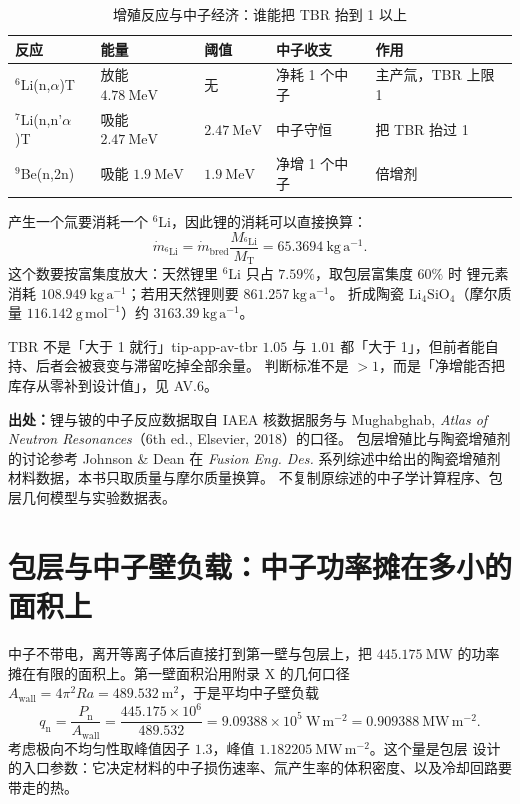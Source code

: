 \begin{table}[htbp]
\centering
\small
\caption{增殖反应与中子经济：谁能把 TBR 抬到 1 以上}
\label{tab:app-av-breeding}
\begin{tabular}{p{3.9cm}p{2.2cm}p{2.0cm}p{3.2cm}p{3.4cm}}
\hline
反应 & 能量 & 阈值 & 中子收支 & 作用 \\
\hline
$^{6}$Li(n,$\alpha$)T & 放能 $4.78\ \mathrm{MeV}$ & 无 & 净耗 1 个中子 & 主产氚，TBR 上限 1 \\
$^{7}$Li(n,n'$\alpha$)T & 吸能 $2.47\ \mathrm{MeV}$ & $2.47\ \mathrm{MeV}$ & 中子守恒 & 把 TBR 抬过 1 \\
$^{9}$Be(n,2n) & 吸能 $1.9\ \mathrm{MeV}$ & $1.9\ \mathrm{MeV}$ & 净增 1 个中子 & 倍增剂 \\
\hline
\end{tabular}
\end{table}

产生一个氚要消耗一个 $^{6}$Li，因此锂的消耗可以直接换算：
\begin{equation}
\dot m_{{}^{6}\mathrm{Li}}=\dot m_\mathrm{bred}\frac{M_{{}^{6}\mathrm{Li}}}{M_\mathrm{T}}
=65.3694\ \mathrm{kg\,a^{-1}}.
\label{eq:app-av-limass}
\end{equation}
这个数要按富集度放大：天然锂里 $^{6}$Li 只占 $7.59\%$，取包层富集度 $60\%$ 时
锂元素消耗 $108.949\ \mathrm{kg\,a^{-1}}$；若用天然锂则要 $861.257\ \mathrm{kg\,a^{-1}}$。
折成陶瓷 $\mathrm{Li_4SiO_4}$（摩尔质量 $116.142\ \mathrm{g\,mol^{-1}}$）约
$3163.39\ \mathrm{kg\,a^{-1}}$。

\begin{tip}{TBR 不是「大于 1 就行」}{tip-app-av-tbr}
$1.05$ 与 $1.01$ 都「大于 1」，但前者能自持、后者会被衰变与滞留吃掉全部余量。
判断标准不是 $>1$，而是「净增能否把库存从零补到设计值」，见 AV.6。
\end{tip}

{\footnotesize
\textbf{出处：}锂与铍的中子反应数据取自 IAEA 核数据服务与
Mughabghab, \emph{Atlas of Neutron Resonances}（6th ed., Elsevier, 2018）的口径。
包层增殖比与陶瓷增殖剂的讨论参考 Johnson \& Dean 在
\emph{Fusion Eng. Des.} 系列综述中给出的陶瓷增殖剂材料数据，本书只取质量与摩尔质量换算。
不复制原综述的中子学计算程序、包层几何模型与实验数据表。
}

\section{包层与中子壁负载：中子功率摊在多小的面积上}
\label{sec:app-av-blanket}

中子不带电，离开等离子体后直接打到第一壁与包层上，把 $445.175\ \mathrm{MW}$ 的功率
摊在有限的面积上。第一壁面积沿用附录 X 的几何口径
$A_\mathrm{wall}=4\pi^{2}Ra=489.532\ \mathrm{m^{2}}$，于是平均中子壁负载
\begin{equation}
q_\mathrm{n}=\frac{P_\mathrm{n}}{A_\mathrm{wall}}
=\frac{445.175\times10^{6}}{489.532}
=9.09388\times10^{5}\ \mathrm{W\,m^{-2}}
=0.909388\ \mathrm{MW\,m^{-2}}.
\label{eq:app-av-nwl}
\end{equation}
考虑极向不均匀性取峰值因子 $1.3$，峰值 $1.182205\ \mathrm{MW\,m^{-2}}$。这个量是包层
设计的入口参数：它决定材料的中子损伤速率、氚产生率的体积密度、以及冷却回路要带走的热。

